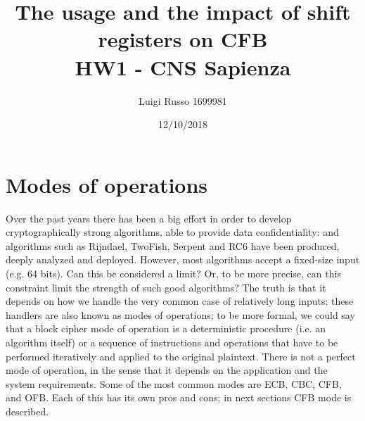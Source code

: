 \documentclass[11 pt]{article}
\title{
	The usage and the impact of shift registers on CFB \\
	\large HW1 - CNS Sapienza}
\author{Luigi Russo 1699981}
\date{12/10/2018}
\begin{document}
\maketitle



\section{Modes of operations}
Over the past years there has been a big effort in order to develop cryptographically strong algorithms, able to provide data confidentiality: and algorithms such as Rijndael, TwoFish, Serpent and RC6 have been produced, deeply analyzed and deployed. However, most algorithms accept a fixed-size input (e.g. 64 bits). Can this be considered a limit? Or, to be more precise, can this constraint limit the strength of such good algorithms? The truth is that it depends on how we handle the very common case of relatively long inputs: these handlers are also known as modes of operations; to be more formal, we could say that a block cipher mode of operation is a deterministic procedure (i.e. an algorithm itself) or a sequence of instructions and operations that have to be performed iteratively and applied to the original plaintext.
There is not a perfect mode of operation, in the sense that it depends on the application and the system requirements. Some of the most common modes are ECB, CBC, CFB, and OFB. Each of this has its own pros and cons; in next sections CFB mode is described.
\end{document}
